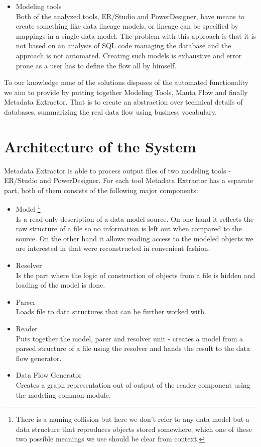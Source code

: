 \begin{itemize}
	\item Modeling tools \\
	Both of the analyzed tools, ER/Studio and PowerDesigner, have means to create something like data lineage models, or lineage can be specified by mappings in a single data model. The problem with this approach is that it is not based on an analysis of SQL code managing the database and the approach is not automated. Creating such models is exhaustive and error prone as a user has to define the flow all by himself. 
\end{itemize}


To our knowledge none of the solutions disposes of the automated functionality we aim to provide by putting together Modeling Tools, Manta Flow and finally Metadata Extractor. That is to create an abstraction over technical details of databases, summarizing the real data flow using business vocabulary.

\section{Architecture of the System}

Metadata Extractor is able to process output files of two modeling tools - ER/Studio and PowerDesigner. For each tool Metadata Extractor has a separate part, both of them consists of the following major components:
\begin{itemize}
	\item Model \footnote{There is a naming collision but here we don't refer to any data model but a data structure that reproduces objects stored somewhere, which one of these two possible meanings we use should be clear from context.}\\ 
	Is a read-only description of a data model source. On one hand it reflects the raw structure of a file so no information is left out when compared to the source. 
	On the other hand it allows reading access to the modeled objects we are interested in that were reconstructed in convenient fashion.
	\item Resolver \\ 
	Is the part where the logic of construction of objects from a file is hidden and loading of the model is done. 
	\item Parser \\ 
	Loads file to data structures that can be further worked with.
	\item Reader \\
	Puts together the model, parer and resolver unit - creates a model from a parsed structure of a file using the resolver and hands the result to the data flow generator.
	\item Data Flow Generator \\ 
	Creates a graph representation out of output of the reader component using the modeling common module.
\end{itemize}

